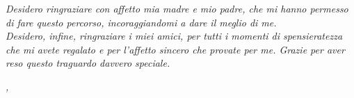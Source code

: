 
\noindent \textit{Desidero ringraziare con affetto mia madre e mio padre, che
	mi
	hanno permesso di fare questo percorso, incoraggiandomi a dare il
	meglio di me.}\\

\noindent \textit{Desidero, infine, ringraziare i miei amici, per tutti i
	momenti di spensieratezza che mi avete regalato e per l'affetto sincero che
	provate per me. Grazie per aver reso questo traguardo davvero speciale.}\\

\bigskip

\noindent\textit{\myLocation, \myTime}
\hfill \myName

\endgroup